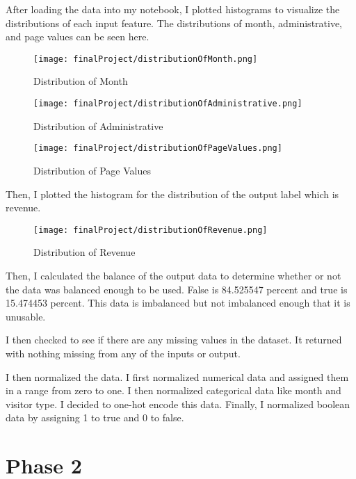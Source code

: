 \documentclass{article}
\begin{document}
After loading the data into my notebook, I plotted histograms to visualize the distributions of each input feature. The distributions of month, administrative, and page values can be seen here.

\begin{figure}[H]
\centering
\texttt{[image: finalProject/distributionOfMonth.png]}
\caption{Distribution of Month}
\label{fig:my_label}
\end{figure}

\begin{figure}[H]
\centering
\texttt{[image: finalProject/distributionOfAdministrative.png]}
\caption{Distribution of Administrative}
\label{fig:my_label}
\end{figure}

\begin{figure}[H]
\centering
\texttt{[image: finalProject/distributionOfPageValues.png]}
\caption{Distribution of Page Values}
\label{fig:my_label}
\end{figure}

Then, I plotted the histogram for the distribution of the output label which is revenue. 

\begin{figure}[H]
\centering
\texttt{[image: finalProject/distributionOfRevenue.png]}
\caption{Distribution of Revenue}
\label{fig:my_label}
\end{figure}

Then, I calculated the balance of the output data to determine whether or not the data was balanced enough to be used. False is 84.525547 percent and true is 15.474453 percent. This data is imbalanced but not imbalanced enough that it is unusable. 

I then checked to see if there are any missing values in the dataset. It returned with nothing missing from any of the inputs or output.

I then normalized the data. I first normalized numerical data and assigned them in a range from zero to one. I then normalized categorical data like month and visitor type. I decided to one-hot encode this data. Finally, I normalized boolean data by assigning 1 to true and 0 to false. 

\section{Phase 2}
\end{document}
